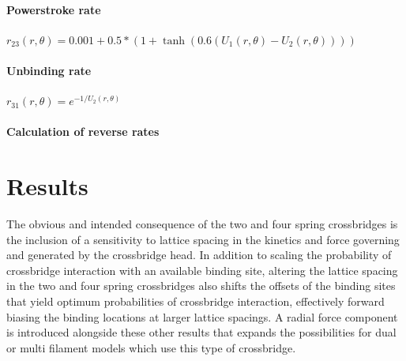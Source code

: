 \documentclass[]{article}
\begin{document}
\paragraph{Powerstroke rate} %

$r_{23}(r, \theta) = 0.001 + 0.5 * (1 + \tanh(0.6 (U_1(r, \theta) - U_2(r, \theta)))) $


\paragraph{Unbinding rate} %

$r_{31}(r, \theta) = e^{-1 / U_2(r, \theta)}$

\paragraph{Calculation of reverse rates} %



\section{Results} %


The obvious and intended consequence of the two and four spring crossbridges is the inclusion of a sensitivity to lattice spacing in the kinetics and force governing and generated by the crossbridge head. 
In addition to scaling the probability of crossbridge interaction with an available binding site, altering the lattice spacing in the two and four spring crossbridges also shifts the offsets of the binding sites that yield optimum probabilities of crossbridge interaction, effectively forward biasing the binding locations at larger lattice spacings.
A radial force component is introduced alongside these other results that expands the possibilities for dual or multi filament models which use this type of crossbridge.
\end{document}
